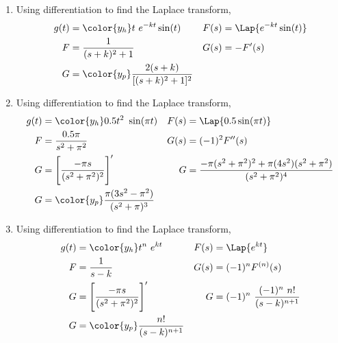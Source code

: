 \begin{enumerate}
    \item Using differentiation to find the Laplace transform,
          \begin{align}
              g(t) & = \color{y_h} t\ e^{-kt}\sin(t)                  &
              F(s) & = \Lap\{ e^{-kt}\sin(t) \}                         \\
              F    & = \frac{1}{(s+k)^2 + 1}                          &
              G(s) & = -F'(s)                                           \\
              G    & = \color{y_p} \frac{2(s + k)}{[(s + k)^2 + 1]^2}
          \end{align}

    \item Using differentiation to find the Laplace transform,
          \begin{align}
              g(t) & = \color{y_h} 0.5 t^2\ \sin(\pi t)                      &
              F(s) & = \Lap\{ 0.5 \sin(\pi t) \}                               \\
              F    & = \frac{0.5\pi}{s^2 + \pi^2}                            &
              G(s) & = (-1)^2 F''(s)                                           \\
              G    & = \Bigg[ \frac{-\pi s}{(s^2 + \pi^2)^2} \Bigg]'         &
              G    & = \frac{-\pi(s^2 + \pi^2)^2 + \pi (4s^2) (s^2 + \pi^2)}
              {(s^2 + \pi^2)^4}                                                \\
              G    & = \color{y_p} \frac{\pi (3s^2 - \pi^2)}{(s^2 + \pi)^3}
          \end{align}

    \item Using differentiation to find the Laplace transform,
          \begin{align}
              g(t) & = \color{y_h} t^n\ e^{kt}                       &
              F(s) & = \Lap\{ e^{kt} \}                                \\
              F    & = \frac{1}{s-k}                                 &
              G(s) & = (-1)^n F^{(n)}(s)                               \\
              G    & = \Bigg[ \frac{-\pi s}{(s^2 + \pi^2)^2} \Bigg]' &
              G    & = (-1)^n\ \frac{(-1)^n\ n!}{(s - k)^{n+1}}        \\
              G    & = \color{y_p} \frac{n!}{(s - k)^{n+1}}
          \end{align}


\end{enumerate}

